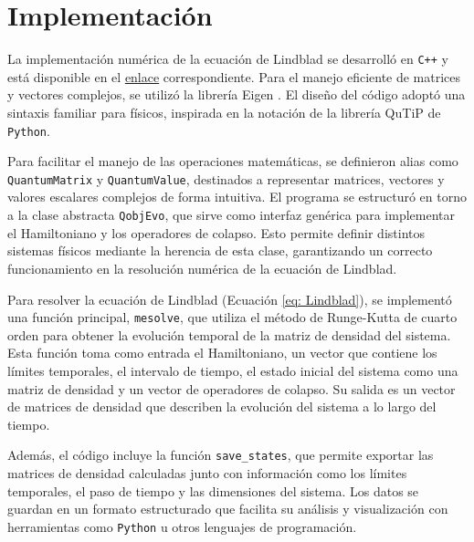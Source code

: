 \section{Implementación} \label{sec: metodologia}

La implementación numérica de la ecuación de Lindblad se desarrolló en \texttt{C++} y está disponible en el \href{https://github.com/elmasi2393/Lindlbland-Solver}{enlace} correspondiente. Para el manejo eficiente de matrices y vectores complejos, se utilizó la librería Eigen \cite{eigenweb}. El diseño del código adoptó una sintaxis familiar para físicos, inspirada en la notación de la librería QuTiP \cite{qutip1,qutip2} de \texttt{Python}.

Para facilitar el manejo de las operaciones matemáticas, se definieron alias como \texttt{QuantumMatrix} y \texttt{QuantumValue}, destinados a representar matrices, vectores y valores escalares complejos de forma intuitiva. El programa se estructuró en torno a la clase abstracta \texttt{QobjEvo}, que sirve como interfaz genérica para implementar el Hamiltoniano y los operadores de colapso. Esto permite definir distintos sistemas físicos mediante la herencia de esta clase, garantizando un correcto funcionamiento en la resolución numérica de la ecuación de Lindblad.

Para resolver la ecuación de Lindblad (Ecuación \ref{eq: Lindblad}), se implementó una función principal, \texttt{mesolve}, que utiliza el método de Runge-Kutta de cuarto orden para obtener la evolución temporal de la matriz de densidad del sistema. Esta función toma como entrada el Hamiltoniano, un vector que contiene los límites temporales, el intervalo de tiempo, el estado inicial del sistema como una matriz de densidad y un vector de operadores de colapso. Su salida es un vector de matrices de densidad que describen la evolución del sistema a lo largo del tiempo.

Además, el código incluye la función \texttt{save\_states}, que permite exportar las matrices de densidad calculadas junto con información como los límites temporales, el paso de tiempo y las dimensiones del sistema. Los datos se guardan en un formato estructurado que facilita su análisis y visualización con herramientas como \texttt{Python} u otros lenguajes de programación.


